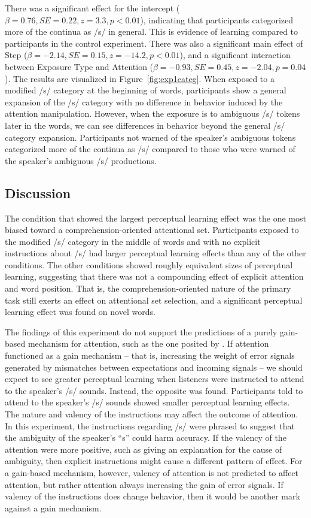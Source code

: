There was a significant effect for the intercept ($\beta = 0.76, SE = 0.22, z = 3.3, p < 0.01$), indicating that participants categorized more of the continua as /s/ in general.  
This is evidence of learning compared to participants in the control experiment.
There was also a significant main effect of Step ($\beta = -2.14, SE = 0.15, z = -14.2, p < 0.01$), and a significant interaction between Exposure Type and Attention ($\beta = -0.93, SE = 0.45, z = -2.04, p = 0.04$).  The results are visualized in Figure~\ref{fig:exp1categ}.
When exposed to a modified /s/ category at the beginning of words, participants show a general expansion of the /s/ category with no difference in behavior induced by the attention manipulation.  
However, when the exposure is to ambiguous /s/ tokens later in the words, we can see differences in behavior beyond the general /s/ category expansion.  
Participants not warned of the speaker's ambiguous tokens categorized more of the continua as /s/ compared to those who were warned of the speaker's ambiguous /s/ productions.

\subsection{Discussion}

The condition that showed the largest perceptual learning effect was the one most biased toward a comprehension-oriented attentional set.
Participants exposed to the modified /s/ category in the middle of words and with no explicit instructions about /s/ had larger perceptual learning effects than any of the other conditions.
The other conditions showed roughly equivalent sizes of perceptual learning, suggesting that there was not a compounding effect of explicit attention and word position.
That is, the comprehension-oriented nature of the primary task still exerts an effect on attentional set selection, and a significant perceptual learning effect was found on novel words.

The findings of this experiment do not support the predictions of a purely gain-based mechanism for attention, such as the one posited by \citet{Clark2013}.
If attention functioned as a gain mechanism -- that is, increasing the weight of error signals generated by mismatches between expectations and incoming signals -- we should expect to see greater perceptual learning when listeners were instructed to attend to the speaker's /s/ sounds.
Instead, the opposite was found.
Participants told to attend to the speaker's /s/ sounds showed smaller perceptual learning effects.
The nature and valency of the instructions may affect the outcome of attention.
In this experiment, the instructions regarding /s/ were phrased to suggest that the ambiguity of the speaker's ``s'' could harm accuracy.
If the valency of the attention were more positive, such as giving an explanation for the cause of ambiguity, then explicit instructions might cause a different pattern of effect.
For a gain-based mechanism, however, valency of attention is not predicted to affect attention, but rather attention always increasing the gain of error signals.
If valency of the instructions does change behavior, then it would be another mark against a gain mechanism.

